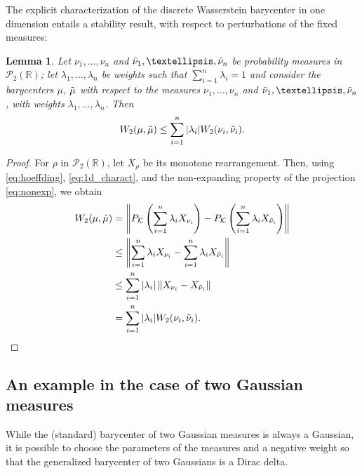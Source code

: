 \documentclass[12pt,a4paper]{article}
\newcommand{\R}{\mathbb{R}}
\renewcommand{\P}{\mathcal{P}}
\newcommand{\K}{\mathcal{K}}
\theoremstyle{plain}
\newtheorem{lemma}[theorem]{Lemma}
\theoremstyle{definition}
\newtheorem{remark}[theorem]{Remark}
\begin{document}
The explicit characterization of the discrete Wasserstein barycenter in one dimension entails a stability result, with respect to perturbations of the fixed measures:
\begin{lemma}
    Let $\nu_1, \ldots, \nu_n$ and $\Tilde{\nu}_1, \ldots, \Tilde{\nu}_n$ be probability measures in $\P_2(\R)$; let $\lambda_1, \ldots, \lambda_n$ be weights such that $\sum_{i=1}^n \lambda_i =1$ and consider the barycenters $\mu$, $\Tilde{\mu}$ with respect to the measures $\nu_1, \ldots, \nu_n$ and $\Tilde{\nu}_1, \ldots, \Tilde{\nu}_n$, with weights $\lambda_1, \ldots, \lambda_n$. Then
    \[
    W_2(\mu, \Tilde{\mu}) \leq \sum_{i=1}^n |\lambda_i|  W_2(\nu_i,\Tilde{\nu}_i).
    \]
\end{lemma}
\label{stability}
\begin{proof}
    For $\rho$ in $\P_2(\R)$, let $X_{\rho}$ be its monotone rearrangement.  Then, using \eqref{eq:hoeffding}, \eqref{eq:1d_charact}, and the non-expanding property of the projection \eqref{eq:nonexp}, we obtain
    \begin{align*}      
        W_2(\mu,\Tilde{\mu}) &= \left\| P_\K \left(\sum_{i=1}^{n} \lambda_i X_{\nu_i}\right) - P_\K \left(\sum_{i=1}^{n} \lambda_i X_{\Tilde{\nu}_i}\right)\right\| \\
		&\leq \left\| \sum_{i=1}^{n} \lambda_i X_{\nu_i} - \sum_{i=1}^{n} \lambda_i X_{\Tilde{\nu}_i}\right\| \\
         &\leq \sum_{i=1}^{n} |\lambda_i| \left\| X_{\nu_i} -  X_{\Tilde{\nu}_i}\right\| \\
         &=  \sum_{i=1}^n |\lambda_i|  W_2(\nu_i,\Tilde{\nu}_i).
    \end{align*}
\end{proof}


\subsection{An example in the case of two Gaussian measures}
\label{ssec:gauss}
While the (standard) barycenter of two Gaussian measures is always a Gaussian, it is possible to choose the parameters of the measures and a negative weight so that the generalized barycenter of two Gaussians is a Dirac delta.
\end{document}
